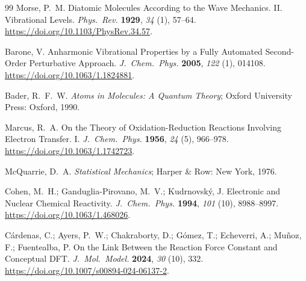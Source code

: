 \begin{thebibliography}{99}
Morse, P.~M. Diatomic Molecules According to the Wave Mechanics. II. Vibrational Levels. \emph{Phys.~Rev.} \textbf{1929}, \emph{34} (1), 57--64. \url{https://doi.org/10.1103/PhysRev.34.57}.

Barone, V. Anharmonic Vibrational Properties by a Fully Automated Second-Order Perturbative Approach. \emph{J.~Chem.~Phys.} \textbf{2005}, \emph{122} (1), 014108. \url{https://doi.org/10.1063/1.1824881}.

Bader, R.~F.~W. \emph{Atoms in Molecules: A Quantum Theory}; Oxford University Press: Oxford, 1990.

Marcus, R.~A. On the Theory of Oxidation-Reduction Reactions Involving Electron Transfer. I. \emph{J.~Chem.~Phys.} \textbf{1956}, \emph{24} (5), 966--978. \url{https://doi.org/10.1063/1.1742723}.

McQuarrie, D.~A. \emph{Statistical Mechanics}; Harper \& Row: New York, 1976.

Cohen, M.~H.; Ganduglia-Pirovano, M.~V.; Kudrnovský, J. Electronic and Nuclear Chemical Reactivity. \emph{J.~Chem.~Phys.} \textbf{1994}, \emph{101} (10), 8988--8997. \url{https://doi.org/10.1063/1.468026}.

Cárdenas, C.; Ayers, P.~W.; Chakraborty, D.; Gómez, T.; Echeverri, A.; Muñoz, F.; Fuentealba, P. On the Link Between the Reaction Force Constant and Conceptual DFT. \emph{J.~Mol.~Model.} \textbf{2024}, \emph{30} (10), 332. \url{https://doi.org/10.1007/s00894-024-06137-2}.

\end{thebibliography}
